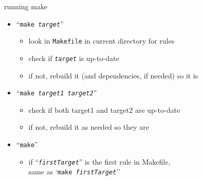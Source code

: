 \begin{frame}{running make}
\begin{itemize}
    \item ``\texttt{make \textit{target}}''
        \begin{itemize}
        \item look in \texttt{Makefile} in current directory for rules
        \item check if \texttt{\textit{target}} is up-to-date
        \item if not, rebuild it (and dependencies, if needed) so it is
        \end{itemize}
    \item ``\texttt{make \textit{target1} \textit{target2}}''
        \begin{itemize}
        \item check if both target1 and target2 are up-to-date
        \item if not, rebuild it as needed so they are
        \end{itemize}
    \item ``\texttt{make}''
        \begin{itemize}
        \item if ``\texttt{\textit{firstTarget}}'' is the first rule in Makefile,\\
            same as `\texttt{make \textit{firstTarget}}''
        \end{itemize}
\end{itemize}
\end{frame}
